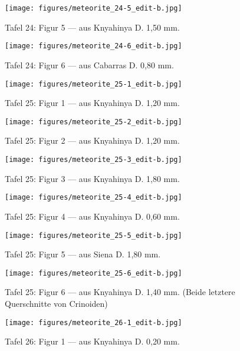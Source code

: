 \documentclass[a4paper, 12pt, oneside]{article}
\begin{document}
\clearpage
\begin{figure}[t]
\texttt{[image: figures/meteorite\_24-5\_edit-b.jpg]}
\caption{Tafel 24: Figur 5 --- aus Knyahinya D. 1,50 mm.}
\centering
\end{figure}
\clearpage
\begin{figure}[t]
\texttt{[image: figures/meteorite\_24-6\_edit-b.jpg]}
\caption{Tafel 24: Figur 6 --- aus Cabarras D. 0,80 mm.}
\centering
\end{figure}
\clearpage
{}
\begin{figure}[t]
\texttt{[image: figures/meteorite\_25-1\_edit-b.jpg]}
\caption{Tafel 25: Figur 1 --- aus Knyahinya D. 1,20 mm.}
\centering
\end{figure}
\clearpage
\begin{figure}[t]
\texttt{[image: figures/meteorite\_25-2\_edit-b.jpg]}
\caption{Tafel 25: Figur 2 --- aus Knyahinya D. 1,20 mm.}
\centering
\end{figure}
\clearpage
\begin{figure}[t]
\texttt{[image: figures/meteorite\_25-3\_edit-b.jpg]}
\caption{Tafel 25: Figur 3 --- aus Knyahinya D. 1,80 mm.}
\centering
\end{figure}
\clearpage
\begin{figure}[t]
\texttt{[image: figures/meteorite\_25-4\_edit-b.jpg]}
\caption{Tafel 25: Figur 4 --- aus Knyahinya D. 0,60 mm.}
\centering
\end{figure}
\clearpage
\begin{figure}[t]
\texttt{[image: figures/meteorite\_25-5\_edit-b.jpg]}
\caption{Tafel 25: Figur 5 --- aus Siena D. 1,80 mm.}
\centering
\end{figure}
\clearpage
\begin{figure}[t]
\texttt{[image: figures/meteorite\_25-6\_edit-b.jpg]}
\caption{Tafel 25: Figur 6 --- aus Knyahinya D. 1,40 mm. (Beide letztere Querschnitte von Crinoiden)}
\centering
\end{figure}
\clearpage
{}
\begin{figure}[t]
\texttt{[image: figures/meteorite\_26-1\_edit-b.jpg]}
\caption{Tafel 26: Figur 1 --- aus Knyahinya D. 0,20 mm.}
\centering
\end{figure}
\end{document}
